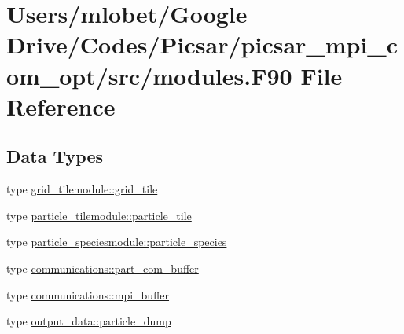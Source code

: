 \hypertarget{modules_8_f90}{}\section{Users/mlobet/\+Google Drive/\+Codes/\+Picsar/picsar\+\_\+mpi\+\_\+com\+\_\+opt/src/modules.F90 File Reference}
\label{modules_8_f90}
\subsection*{Data Types}
\begin{DoxyCompactItemize}
\item 
type \hyperlink{structgrid__tilemodule_1_1grid__tile}{grid\+\_\+tilemodule\+::grid\+\_\+tile}
\item 
type \hyperlink{structparticle__tilemodule_1_1particle__tile}{particle\+\_\+tilemodule\+::particle\+\_\+tile}
\item 
type \hyperlink{structparticle__speciesmodule_1_1particle__species}{particle\+\_\+speciesmodule\+::particle\+\_\+species}
\item 
type \hyperlink{structcommunications_1_1part__com__buffer}{communications\+::part\+\_\+com\+\_\+buffer}
\item 
type \hyperlink{structcommunications_1_1mpi__buffer}{communications\+::mpi\+\_\+buffer}
\item 
type \hyperlink{structoutput__data_1_1particle__dump}{output\+\_\+data\+::particle\+\_\+dump}
\end{DoxyCompactItemize}

